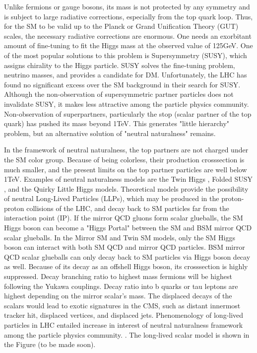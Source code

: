 Unlike fermions or gauge bosons, its mass is not protected by any symmetry and is subject to large radiative corrections, especially from the top quark loop. 
Thus, for the SM to be valid up to the Planck or Grand Unification Theory (GUT) scales, the necessary radiative corrections are enormous. 
One needs an exorbitant amount of fine-tuning to fit the Higgs mass at the observed value of 125GeV.
One of the most popular solutions to this problem is Supersymmetry (SUSY), which assigns chirality to the Higgs particle. 
SUSY solves the fine-tuning problem, neutrino masses, and provides a candidate for DM. 
Unfortunately, the LHC has found no significant excess over the SM background in their search for SUSY\cite{SUSY}. 
Although the non-observation of supersymmetric partner particles does not invalidate SUSY, it makes less attractive among the particle physics community. 
Non-observation of superpartners, particularly the stop (scalar partner of the top quark) has pushed its mass beyond 1TeV. 
This generates "little hierarchy" problem, but an alternative solution of "neutral naturalness" remains. 

In the framework of neutral naturalness, the top partners are not charged under the SM color group. 
Because of being colorless, their production crosssection is much smaller, and the present limits on the top partner particles are well below 1TeV. 
Examples of neutral naturalness models are the Twin Higgs \cite{Chacko:2005pe},
Folded SUSY \cite{Burdman:2006tz}, and the Quirky Little Higgs \cite{Cai:2008au} models.
Theoretical models provide the possibility of neutral Long-Lived Particles (LLPs), which may be produced in the proton-proton
collisions of the LHC, and decay back to SM particles far from the interaction point (IP).\cite{Craig:2015pha}
If the mirror QCD gluons form scalar glueballs, the SM Higgs boson can become a "Higgs Portal" between the SM and BSM mirror QCD scalar glueballs. 
In the Mirror SM and Twin SM models, only the SM Higgs boson can interact with both SM QCD and mirror QCD particles.
BSM mirror QCD scalar glueballs can only decay back to SM particles via Higgs boson decay as well. 
Because of its decay as an offshell Higgs boson, its crosssection is highly suppressed. 
Decay branching ratio to highest mass fermions will be highest following the Yukawa couplings.
Decay ratio into b quarks or tau leptons are highest depending on the mirror scalar's mass.
The displaced decays of the scalars would lead to exotic signatures in the CMS, such as distant innermost tracker hit, displaced vertices, and displaced jets.
Phenomenology of long-lived particles in LHC entailed increase in interest of neutral naturalness framework among the particle physics community. \cite{Curtin:2015fna,Csaki:2015fba}.
The long-lived scalar model is shown in the Figure (to be made soon).

